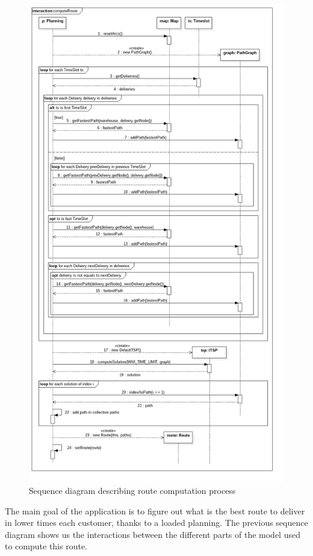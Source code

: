 \documentclass[paper=a4, fontsize=11pt]{report}
\numberwithin{equation}{section}		%
\numberwithin{figure}{section}		%
\numberwithin{table}{section}		%
\begin{document}
\begin{figure}[H]
\centering
\includegraphics[scale=0.35,angle=0]{figures/sequence-diagram-route-compute.png}
\caption{Sequence diagram describing route computation process}
\end{figure}

The main goal of the application is to figure out what is the best route to deliver in lower times each customer, thanks to a loaded planning. The previous sequence diagram shows us the interactions between the different parts of the model used to compute this route.\\
\end{document}
